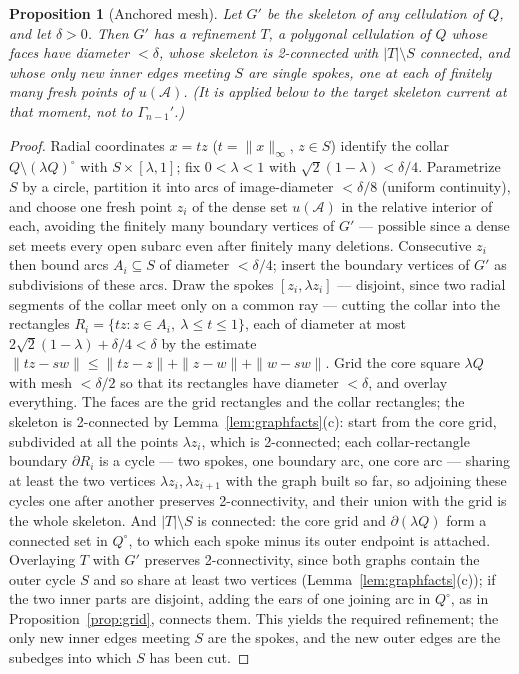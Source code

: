 \documentclass[11pt,a4paper]{article}
\theoremstyle{jsplain}
\newtheorem{proposition}[theorem]{Proposition}
\theoremstyle{jsdefn}
\begin{document}
\begin{proposition}[Anchored mesh]\label{prop:mesh}
Let $G'$ be the skeleton of any cellulation of $Q$, and let
$\delta>0$. Then $G'$ has a refinement $T$, a polygonal cellulation of
$Q$ whose faces have diameter $<\delta$, whose skeleton is 2-connected
with $|T|\setminus S$ connected, and whose only new inner edges meeting
$S$ are single \emph{spokes}, one at each of finitely many fresh points
of $u(\mathcal A)$. \textup(It is applied below to the target skeleton
current at that moment, not to $\Gamma_{n-1}'$.\textup)
\end{proposition}
\begin{proof}
Radial coordinates $x=tz$ ($t=\|x\|_\infty$, $z\in S$) identify the
collar $Q\setminus(\lambda Q)^\circ$ with $S\times[\lambda,1]$; fix
$0<\lambda<1$ with $\sqrt2(1-\lambda)<\delta/4$. Parametrize $S$ by a
circle, partition it into arcs of image-diameter $<\delta/8$ (uniform
continuity), and choose one fresh point $z_i$ of the dense set
$u(\mathcal A)$ in the relative interior of each, avoiding the finitely
many boundary vertices of $G'$ --- possible since a dense set meets every open subarc
even after finitely many deletions. Consecutive $z_i$ then bound arcs
$A_i\subseteq S$ of diameter $<\delta/4$; insert the boundary vertices
of $G'$ as subdivisions of these arcs. Draw the spokes
$[z_i,\lambda z_i]$ --- disjoint, since two radial segments of the
collar meet only on a common ray --- cutting the collar into the
rectangles $R_i=\{tz:z\in A_i,\ \lambda\le t\le1\}$, each of diameter
at most $2\sqrt2(1-\lambda)+\delta/4<\delta$ by the estimate
$\|tz-sw\|\le\|tz-z\|+\|z-w\|+\|w-sw\|$. Grid the core square
$\lambda Q$ with mesh $<\delta/2$ so that its rectangles have diameter
$<\delta$, and overlay everything. The faces are the grid rectangles
and the collar rectangles; the skeleton is 2-connected by
Lemma~\ref{lem:graphfacts}(c): start from the core grid, subdivided
at all the points $\lambda z_i$, which is 2-connected; each
collar-rectangle boundary $\partial R_i$ is a cycle --- two spokes,
one boundary arc, one core arc --- sharing at least the two vertices
$\lambda z_i,\lambda z_{i+1}$ with the graph built so far, so
adjoining these cycles one after another preserves 2-connectivity,
and their union with the grid is the whole skeleton. And
$|T|\setminus S$ is connected: the core grid and $\partial(\lambda Q)$ form a connected
set in $Q^\circ$, to which each spoke minus its outer endpoint is
attached. Overlaying $T$ with $G'$ preserves 2-connectivity, since both graphs
contain the outer cycle $S$ and so share at least two vertices
(Lemma~\ref{lem:graphfacts}(c)); if the two inner parts are disjoint,
adding the ears of one joining arc in $Q^\circ$, as in
Proposition~\ref{prop:grid}, connects them. This yields the required
refinement; the only new inner edges meeting $S$ are the spokes, and
the new outer edges are the subedges into which $S$ has been cut.
\end{proof}
\end{document}
